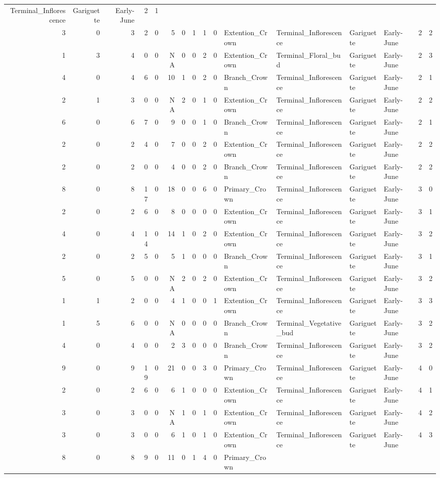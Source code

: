 \documentclass[]{article}
\begin{document}
\begin{longtable}[]{@{}rrrrrrrrrrllllrl@{}}
Terminal\_Inflorescence & Gariguette & Early-June & 2 & 1\tabularnewline
3 & 0 & 3 & 2 & 0 & 5 & 0 & 1 & 1 & 0 & Extention\_Crown &
Terminal\_Inflorescence & Gariguette & Early-June & 2 & 2\tabularnewline
1 & 3 & 4 & 0 & 0 & NA & 0 & 0 & 2 & 0 & Extention\_Crown &
Terminal\_Floral\_bud & Gariguette & Early-June & 2 & 3\tabularnewline
4 & 0 & 4 & 6 & 0 & 10 & 1 & 0 & 2 & 0 & Branch\_Crown &
Terminal\_Inflorescence & Gariguette & Early-June & 2 & 1\tabularnewline
2 & 1 & 3 & 0 & 0 & NA & 2 & 0 & 1 & 0 & Extention\_Crown &
Terminal\_Inflorescence & Gariguette & Early-June & 2 & 2\tabularnewline
6 & 0 & 6 & 7 & 0 & 9 & 0 & 0 & 1 & 0 & Branch\_Crown &
Terminal\_Inflorescence & Gariguette & Early-June & 2 & 1\tabularnewline
2 & 0 & 2 & 4 & 0 & 7 & 0 & 0 & 2 & 0 & Extention\_Crown &
Terminal\_Inflorescence & Gariguette & Early-June & 2 & 2\tabularnewline
2 & 0 & 2 & 0 & 0 & 4 & 0 & 0 & 2 & 0 & Branch\_Crown &
Terminal\_Inflorescence & Gariguette & Early-June & 2 & 2\tabularnewline
8 & 0 & 8 & 17 & 0 & 18 & 0 & 0 & 6 & 0 & Primary\_Crown &
Terminal\_Inflorescence & Gariguette & Early-June & 3 & 0\tabularnewline
2 & 0 & 2 & 6 & 0 & 8 & 0 & 0 & 0 & 0 & Extention\_Crown &
Terminal\_Inflorescence & Gariguette & Early-June & 3 & 1\tabularnewline
4 & 0 & 4 & 14 & 0 & 14 & 1 & 0 & 2 & 0 & Extention\_Crown &
Terminal\_Inflorescence & Gariguette & Early-June & 3 & 2\tabularnewline
2 & 0 & 2 & 5 & 0 & 5 & 1 & 0 & 0 & 0 & Branch\_Crown &
Terminal\_Inflorescence & Gariguette & Early-June & 3 & 1\tabularnewline
5 & 0 & 5 & 0 & 0 & NA & 2 & 0 & 2 & 0 & Extention\_Crown &
Terminal\_Inflorescence & Gariguette & Early-June & 3 & 2\tabularnewline
1 & 1 & 2 & 0 & 0 & 4 & 1 & 0 & 0 & 1 & Extention\_Crown &
Terminal\_Inflorescence & Gariguette & Early-June & 3 & 3\tabularnewline
1 & 5 & 6 & 0 & 0 & NA & 0 & 0 & 0 & 0 & Branch\_Crown &
Terminal\_Vegetative\_bud & Gariguette & Early-June & 3 &
2\tabularnewline
4 & 0 & 4 & 0 & 0 & 2 & 3 & 0 & 0 & 0 & Branch\_Crown &
Terminal\_Inflorescence & Gariguette & Early-June & 3 & 2\tabularnewline
9 & 0 & 9 & 19 & 0 & 21 & 0 & 0 & 3 & 0 & Primary\_Crown &
Terminal\_Inflorescence & Gariguette & Early-June & 4 & 0\tabularnewline
2 & 0 & 2 & 6 & 0 & 6 & 1 & 0 & 0 & 0 & Extention\_Crown &
Terminal\_Inflorescence & Gariguette & Early-June & 4 & 1\tabularnewline
3 & 0 & 3 & 0 & 0 & NA & 1 & 0 & 1 & 0 & Extention\_Crown &
Terminal\_Inflorescence & Gariguette & Early-June & 4 & 2\tabularnewline
3 & 0 & 3 & 0 & 0 & 6 & 1 & 0 & 1 & 0 & Extention\_Crown &
Terminal\_Inflorescence & Gariguette & Early-June & 4 & 3\tabularnewline
8 & 0 & 8 & 9 & 0 & 11 & 0 & 1 & 4 & 0 & Primary\_Crown &

\end{longtable}
\end{document}
